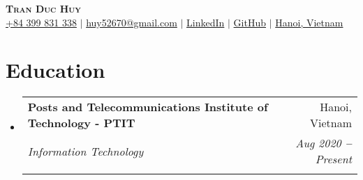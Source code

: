 \documentclass[letterpaper,11pt]{article}
\makeatletter
\newcommand{\resumeItem}[1]{
  \item\small{
  {#1 \vspace{-2pt}}
  }
}
\newcommand{\resumeSubheading}[4]{
  \vspace{-2pt}\item
    \begin{tabular*}{0.97\textwidth}[t]{l@{\extracolsep{\fill}}r}
      \textbf{#1} & #2 \\
      \textit{\small#3} & \textit{\small #4} \\
    \end{tabular*}\vspace{-7pt}
}
\newcommand{\resumeEducationHeading}[6]{
  \vspace{-2pt}\item
    \begin{tabular*}{0.97\textwidth}[t]{l@{\extracolsep{\fill}}r}
      \textbf{#1} & #2 \\
      \textit{\small#3} & \textit{\small #4} \\
      \textit{\small#5} & \textit{\small #6} \\
    \end{tabular*}\vspace{-5pt}
}
\newcommand{\resumeSubHeadingListStart}{\begin{itemize}[leftmargin=0.15in, label={}]}
\newcommand{\resumeSubHeadingListEnd}{\end{itemize}}
\newcommand{\resumeItemListStart}{\begin{itemize}}
\newcommand{\resumeItemListEnd}{\end{itemize}\vspace{-5pt}}
\makeatother
\begin{document}

\begin{center}
  \textbf{\Huge \scshape Tran Duc Huy} \\ \vspace{3pt}
  \small
  \faMobile \hspace{.5pt} \href{tel:84399831338}{+84 399 831 338}
  $|$
  \faAt \hspace{.5pt} \href{mailto:huy52670@gmail.com}{huy52670@gmail.com}
  $|$
  \faLinkedinSquare \hspace{.5pt} \href{https://www.linkedin.com/in/huy31-1b80a1297/}{LinkedIn}
  $|$
  \faGithub \hspace{.5pt} \href{https://github.com/duchuys31}{GitHub}
  $|$
  \faMapMarker \hspace{.5pt} \href{https://www.google.com/maps/place/Hanoi,+Vietnam/@21.02288,105.7545628,12z/data=!3m1!4b1!4m6!3m5!1s0x3135ab9bd9861ca1:0xe7887f7b72ca17a9!8m2!3d21.0277644!4d105.8341598!16zL20vMGZuZmY?entry=ttu}{Hanoi, Vietnam}
\end{center}




\section{Education}
\vspace{3pt}
\resumeSubHeadingListStart

\resumeEducationHeading
{Posts and Telecommunications Institute of Technology - PTIT}{Hanoi, Vietnam}
{Information Technology   \textbf{}}{Aug 2020 \textbf{--} Present}
{}{}


\resumeSubHeadingListEnd
\end{document}
